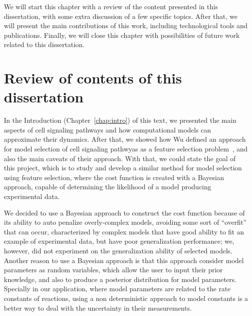 We will start this chapter with a review of the content presented in 
this dissertation, with some extra discussion of a few specific topics.
After that, we will present the main contributions of this work,
including technological tools and publications. Finally, we will close
this chapter with possibilities of future work related to this
dissertation.


\section{Review of contents of this dissertation}
In the Introduction (Chapter~\ref{chap:intro}) of this text, we presented the main aspects of cell
signaling pathways and how computational models can approximate their
dynamics. After that, we showed how Wu defined an approach
for model selection of cell signaling pathwyas as a feature selection
problem~\cite{Wu15}, and also the main caveats of their approach. With that, we
could state the goal of this project, which is to study and develop a
similar method for model selection using feature selection, where the 
cost function is created with a Bayesian approach, capable of
determining the likelihood of a model producing experimental data.


We decided to use a Bayesian approach to construct the cost function
because of its ability to auto penalize overly-complex models, avoiding
some sort of ``overfit'' that can occur, characterized by complex models
that have good ability to fit an example of experimental data, but have 
poor generalization performance; we, however, did not experiment on
the generalization ability of selected models. Another reason to use a
Bayesian approach is that this approach consider model parameters as
random  variables, which allow the user to input their prior knowledge,
and also to produce a posterior distribution for model parameters.
Specially in our application, where model parameters are related to the
rate constants of reactions, using a non deterministic approach to model
constants is a better way to deal with the uncertainty in their
measurements.

%

